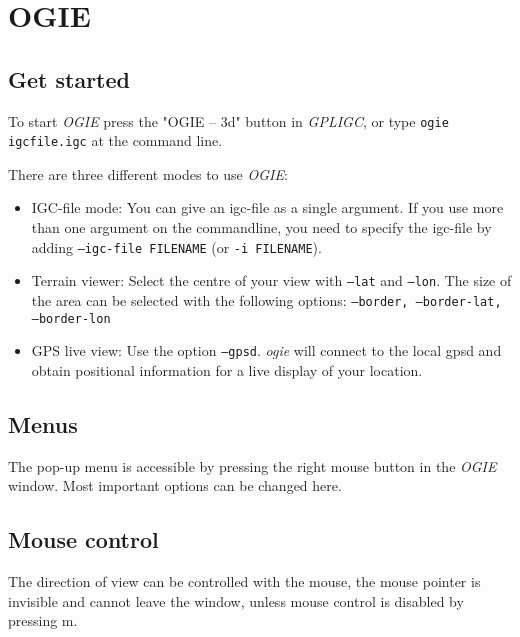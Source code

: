

\section{OGIE}
\label{ogie}

\subsection{Get started}
To start \emph{OGIE} press the "OGIE -- 3d" button in \emph{GPLIGC},
or type \texttt{ogie igcfile.igc}
at the command line.%

There are three different modes to use \emph{OGIE}:

\begin{itemize}

\item IGC-file mode:
You can give an igc-file as a single argument.
If you use more than one argument on the commandline, you need to specify
the igc-file by adding  \texttt{--igc-file FILENAME} (or \texttt{-i FILENAME}).

\item Terrain viewer: Select the centre of your view with  \texttt{--lat} and \texttt{--lon}. The size of the area can be selected with the following options: \texttt{--border, --border-lat, --border-lon}

\item GPS live view: Use the option \texttt{--gpsd}. \emph{ogie} will connect to the local gpsd \cite{gpsd} and obtain positional information for a live display of your location.

\end{itemize}

\subsection{Menus}
The pop-up menu is accessible by pressing the right mouse button in the \emph{OGIE} window. Most important options can be changed here.


\subsection{Mouse control}
The direction of view can be controlled with the mouse, the mouse pointer is invisible and cannot leave the window, unless
mouse control is disabled by pressing m.


